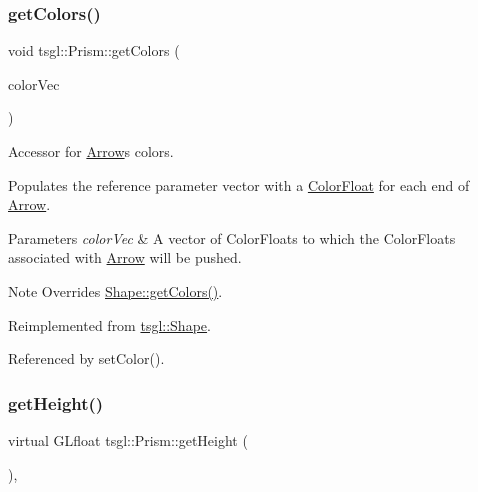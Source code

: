 \subsubsection{\texorpdfstring{get\+Colors()}{getColors()}}
{\footnotesize\ttfamily void tsgl\+::\+Prism\+::get\+Colors (\begin{DoxyParamCaption}\item[{std\+::vector$<$ \hyperlink{structtsgl_1_1_color_float}{Color\+Float} $>$ \&}]{color\+Vec }\end{DoxyParamCaption})\hspace{0.3cm}{\ttfamily [virtual]}}



Accessor for \hyperlink{classtsgl_1_1_arrow}{Arrow}\textquotesingle{}s colors. 

Populates the reference parameter vector with a \hyperlink{structtsgl_1_1_color_float}{Color\+Float} for each end of \hyperlink{classtsgl_1_1_arrow}{Arrow}. 
\begin{DoxyParams}{Parameters}
{\em color\+Vec} & A vector of Color\+Floats to which the Color\+Floats associated with \hyperlink{classtsgl_1_1_arrow}{Arrow} will be pushed. \\
\hline
\end{DoxyParams}
\begin{DoxyNote}{Note}
Overrides \hyperlink{classtsgl_1_1_shape_a6f54fe4d049f69a287edf8335a9509f8}{Shape\+::get\+Colors()}. 
\end{DoxyNote}


Reimplemented from \hyperlink{classtsgl_1_1_shape_a6f54fe4d049f69a287edf8335a9509f8}{tsgl\+::\+Shape}.



Referenced by set\+Color().

\mbox{\label{classtsgl_1_1_prism_a5a62be4c54080aa3171d8bf9a2d9caf0}} 
\subsubsection{\texorpdfstring{get\+Height()}{getHeight()}}
{\footnotesize\ttfamily virtual G\+Lfloat tsgl\+::\+Prism\+::get\+Height (\begin{DoxyParamCaption}{ }\end{DoxyParamCaption})\hspace{0.3cm}{\ttfamily [inline]}, {\ttfamily [virtual]}}



